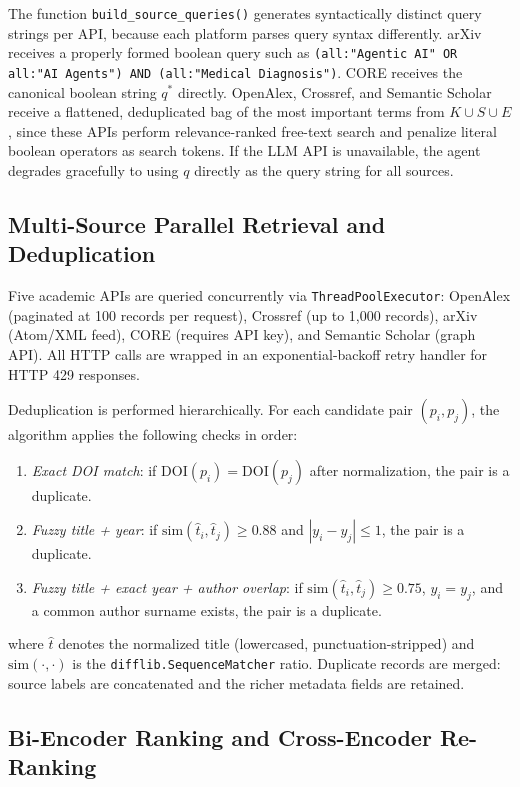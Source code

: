 \documentclass[conference]{IEEEtran}
\begin{document}
The function \texttt{build\_source\_queries()} generates syntactically
distinct query strings per API, because each platform parses query syntax
differently. arXiv receives a properly formed boolean query such as
\texttt{(all:"Agentic AI" OR all:"AI Agents") AND (all:"Medical Diagnosis")}.
CORE receives the canonical boolean string $q^*$ directly. OpenAlex,
Crossref, and Semantic Scholar receive a flattened, deduplicated bag of the
most important terms from $K \cup S \cup E$, since these APIs perform
relevance-ranked free-text search and penalize literal boolean operators as
search tokens. If the LLM API is unavailable, the agent degrades gracefully
to using $q$ directly as the query string for all sources.

\subsection{Multi-Source Parallel Retrieval and Deduplication}

Five academic APIs are queried concurrently via \texttt{ThreadPoolExecutor}:
OpenAlex (paginated at 100 records per request), Crossref (up to 1,000
records), arXiv (Atom/XML feed), CORE (requires API key), and Semantic
Scholar (graph API). All HTTP calls are wrapped in an exponential-backoff
retry handler for HTTP 429 responses.

Deduplication is performed hierarchically. For each candidate pair
$(p_i, p_j)$, the algorithm applies the following checks in order:
\begin{enumerate}
    \item \textit{Exact DOI match}: if $\mathrm{DOI}(p_i) = \mathrm{DOI}(p_j)$
    after normalization, the pair is a duplicate.
    \item \textit{Fuzzy title + year}: if
    $\mathrm{sim}(\hat{t}_i, \hat{t}_j) \ge 0.88$ and
    $|y_i - y_j| \le 1$, the pair is a duplicate.
    \item \textit{Fuzzy title + exact year + author overlap}: if
    $\mathrm{sim}(\hat{t}_i, \hat{t}_j) \ge 0.75$,
    $y_i = y_j$, and a common author surname exists, the pair
    is a duplicate.
\end{enumerate}
where $\hat{t}$ denotes the normalized title (lowercased,
punctuation-stripped) and $\mathrm{sim}(\cdot,\cdot)$ is the
\texttt{difflib.SequenceMatcher} ratio. Duplicate records are merged:
source labels are concatenated and the richer metadata fields are retained.

\subsection{Bi-Encoder Ranking and Cross-Encoder Re-Ranking}
\end{document}
